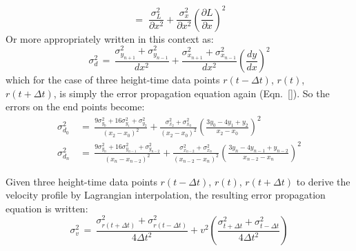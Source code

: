 \documentclass[namedreferences]{SolarPhysics}
\begin{document}
\begin{article}
\begin{equation}
=\; \frac{\sigma_L^2}{\partial x^2}+\frac{\sigma_x^2}{\partial x^2}\left(\frac{\partial L}{\partial x}\right)^2
\end{equation}
Or more appropriately written in this context as:
\begin{equation}
\sigma_d^2 \,=\, \frac{\sigma_{y_{n+1}}^2+\sigma_{y_{n-1}}^2}{dx^2} + \frac{\sigma_{x_{n+1}}^2+\sigma_{x_{n-1}}^2}{dx^2}\left(\frac{dy}{dx}\right)^2
\end{equation}
which for the case of three height-time data points $r(t-\Delta t)$, $r(t)$, $r(t+\Delta t)$, is simply the error propagation equation again (Eqn.~\ref{}).
So the errors on the end points become:
\begin{eqnarray}
\sigma_{d_0}^2 \,&=\, \frac{9\sigma_{y_0}^2+16\sigma_{y_1}^2+\sigma_{y_2}^2}{\left(x_2-x_0\right)^2} + \frac{\sigma_{x_2}^2+\sigma_{x_0}^2}{\left(x_2-x_0\right)^2} \left( \frac{3y_0-4y_1+y_2}{x_2-x_0}\right)^2 \\
\sigma_{d_n}^2 \,&=\, \frac{9\sigma_{y_n}^2+16\sigma_{y_{n-1}}^2+\sigma_{y_{n-2}}^2}{\left(x_n-x_{n-2}\right)^2} + \frac{\sigma_{x_{n-2}}^2+\sigma_{x_n}^2}{\left(x_{n-2}-x_n\right)^2} \left( \frac{3y_n-4y_{n-1}+y_{n-2}}{x_{n-2}-x_n}\right)^2
\end{eqnarray}

Given three height-time data points $r(t-\Delta t)$, $r(t)$, $r(t+\Delta t)$ to derive the velocity profile by Lagrangian interpolation, the resulting error propagation equation is written:
\begin{equation}
\sigma_v^2 \,=\, \frac{\sigma_{r(t+\Delta t)}^2+\sigma_{r(t-\Delta t)}^2}{4\Delta t^2} + v^2 \left( \frac{\sigma_{t+\Delta t}^2+\sigma_{t-\Delta t}^2}{4\Delta t^2} \right)
\end{equation}



\end{article}
\end{document}
